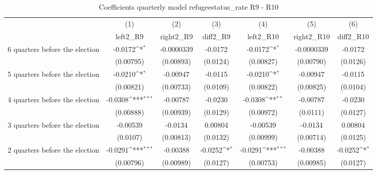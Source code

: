 \begin{table}[htbp]\centering
\def\sym#1{\ifmmode^{#1}\else\(^{#1}\)\fi}
\caption{Coefficients quarterly model refugeestatus\_rate R9 - R10}
\begin{tabular}{l*{6}{c}}
\hline\hline
                    &\multicolumn{1}{c}{(1)}&\multicolumn{1}{c}{(2)}&\multicolumn{1}{c}{(3)}&\multicolumn{1}{c}{(4)}&\multicolumn{1}{c}{(5)}&\multicolumn{1}{c}{(6)}\\
                    &\multicolumn{1}{c}{left2\_R9}&\multicolumn{1}{c}{right2\_R9}&\multicolumn{1}{c}{diff2\_R9}&\multicolumn{1}{c}{left2\_R10}&\multicolumn{1}{c}{right2\_R10}&\multicolumn{1}{c}{diff2\_R10}\\
\hline
 6 quarters before the election&     -0.0172\sym{*}  &  -0.0000339         &     -0.0172         &     -0.0172\sym{*}  &  -0.0000339         &     -0.0172         \\
                    &   (0.00795)         &   (0.00893)         &    (0.0124)         &   (0.00827)         &   (0.00790)         &    (0.0126)         \\
[1em]
 5 quarters before the election&     -0.0210\sym{*}  &    -0.00947         &     -0.0115         &     -0.0210\sym{*}  &    -0.00947         &     -0.0115         \\
                    &   (0.00821)         &   (0.00733)         &    (0.0109)         &   (0.00822)         &   (0.00825)         &    (0.0104)         \\
[1em]
 4 quarters before the election&     -0.0308\sym{***}&    -0.00787         &     -0.0230         &     -0.0308\sym{**} &    -0.00787         &     -0.0230         \\
                    &   (0.00888)         &   (0.00939)         &    (0.0129)         &   (0.00972)         &    (0.0111)         &    (0.0127)         \\
[1em]
 3 quarters before the election&    -0.00539         &     -0.0134         &     0.00804         &    -0.00539         &     -0.0134         &     0.00804         \\
                    &    (0.0107)         &   (0.00813)         &    (0.0132)         &   (0.00999)         &   (0.00714)         &    (0.0125)         \\
[1em]
 2 quarters before the election&     -0.0291\sym{***}&    -0.00388         &     -0.0252\sym{*}  &     -0.0291\sym{***}&    -0.00388         &     -0.0252\sym{*}  \\
                    &   (0.00796)         &   (0.00989)         &    (0.0127)         &   (0.00753)         &   (0.00985)         &    (0.0127)         \\

\end{tabular}
\end{table}
